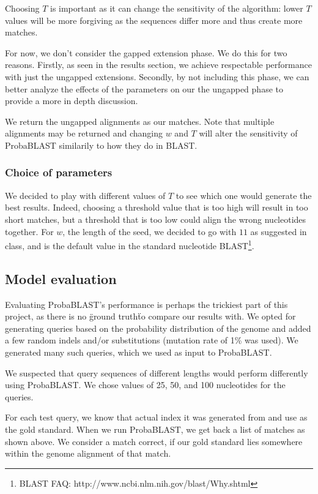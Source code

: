 \documentclass[10pt]{IEEEtran}
\begin{document}
Choosing $T$ is important as it can change the sensitivity of the algorithm: lower $T$ values will be more forgiving as the sequences differ more and thus create more matches.

For now, we don't consider the gapped extension phase. We do this for two reasons. Firstly, as seen in the results section, we achieve respectable performance with just the ungapped extensions. Secondly, by not including this phase, we can better analyze the effects of the parameters on our the ungapped phase to provide a more in depth discussion.

We return the ungapped alignments as our matches. Note that multiple alignments may be returned and changing $w$ and $T$ will alter the sensitivity of ProbaBLAST similarily to how they do in BLAST.

\subsubsection{Choice of parameters}

We decided to play with different values of $T$ to see which one would generate the best results. Indeed, choosing a threshold value that is too high will result in too short matches, but a threshold that is too low could align the wrong nucleotides together.
For $w$, the length of the seed, we decided to go with $11$ as suggested in class, and is the default value in the standard nucleotide BLAST\footnote{BLAST FAQ: http://www.ncbi.nlm.nih.gov/blast/Why.shtml}.

\subsection{Model evaluation}

Evaluating ProbaBLAST's performance is perhaps the trickiest part of this project, as there is no \"ground truth\" to compare our results with. We opted for generating queries based on the probability distribution of the genome and added a few random indels and/or substitutions (mutation rate of 1\% was used). We generated many such queries, which we used as input to ProbaBLAST.

We suspected that query sequences of different lengths would perform differently using ProbaBLAST. We chose values of 25, 50, and 100 nucleotides for the queries. 

For each test query, we know that actual index it was generated from and use as the gold standard. When we run ProbaBLAST, we get back a list of matches as shown above. We consider a match correct, if our gold standard lies somewhere within the genome alignment of that match.
\end{document}

